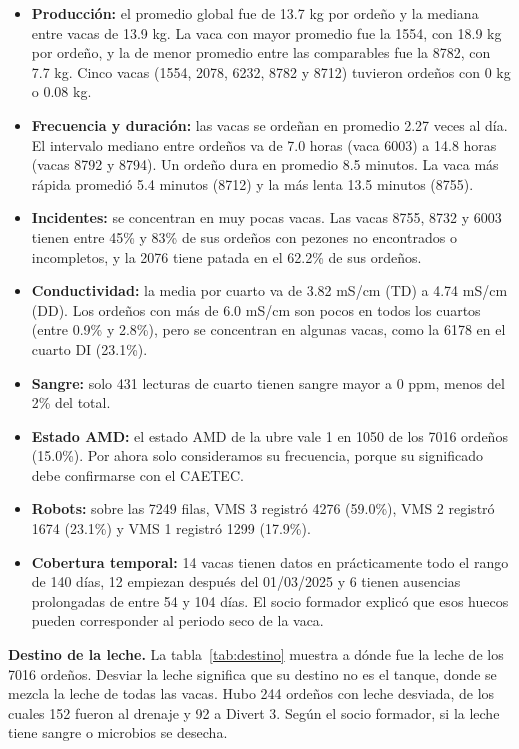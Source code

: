 \begin{itemize}
  \item \textbf{Producción:} el promedio global fue de 13.7 kg por ordeño y la mediana entre vacas de 13.9 kg. La vaca con mayor promedio fue la 1554, con 18.9 kg por ordeño, y la de menor promedio entre las comparables fue la 8782, con 7.7 kg. Cinco vacas (1554, 2078, 6232, 8782 y 8712) tuvieron ordeños con 0 kg o 0.08 kg.
  \item \textbf{Frecuencia y duración:} las vacas se ordeñan en promedio 2.27 veces al día. El intervalo mediano entre ordeños va de 7.0 horas (vaca 6003) a 14.8 horas (vacas 8792 y 8794). Un ordeño dura en promedio 8.5 minutos. La vaca más rápida promedió 5.4 minutos (8712) y la más lenta 13.5 minutos (8755).
  \item \textbf{Incidentes:} se concentran en muy pocas vacas. Las vacas 8755, 8732 y 6003 tienen entre 45\% y 83\% de sus ordeños con pezones no encontrados o incompletos, y la 2076 tiene patada en el 62.2\% de sus ordeños.
  \item \textbf{Conductividad:} la media por cuarto va de 3.82 mS/cm (TD) a 4.74 mS/cm (DD). Los ordeños con más de 6.0 mS/cm son pocos en todos los cuartos (entre 0.9\% y 2.8\%), pero se concentran en algunas vacas, como la 6178 en el cuarto DI (23.1\%).
  \item \textbf{Sangre:} solo 431 lecturas de cuarto tienen sangre mayor a 0 ppm, menos del 2\% del total.
  \item \textbf{Estado AMD:} el estado AMD de la ubre vale 1 en 1050 de los 7016 ordeños (15.0\%). Por ahora solo consideramos su frecuencia, porque su significado debe confirmarse con el CAETEC.
  \item \textbf{Robots:} sobre las 7249 filas, VMS 3 registró 4276 (59.0\%), VMS 2 registró 1674 (23.1\%) y VMS 1 registró 1299 (17.9\%).
  \item \textbf{Cobertura temporal:} 14 vacas tienen datos en prácticamente todo el rango de 140 días, 12 empiezan después del 01/03/2025 y 6 tienen ausencias prolongadas de entre 54 y 104 días. El socio formador explicó que esos huecos pueden corresponder al periodo seco de la vaca.
\end{itemize}

\textbf{Destino de la leche.} La tabla~\ref{tab:destino} muestra a dónde fue la leche de los 7016 ordeños. Desviar la leche significa que su destino no es el tanque, donde se mezcla la leche de todas las vacas. Hubo 244 ordeños con leche desviada, de los cuales 152 fueron al drenaje y 92 a Divert 3. Según el socio formador, si la leche tiene sangre o microbios se desecha.


